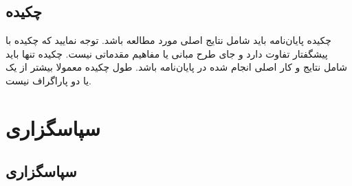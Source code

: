 \documentclass[12pt]{report}
\begin{document}
	\section*{چکیده}
	چکیده پایان‌نامه باید شامل نتایج اصلی مورد مطالعه باشد. توجه نمایید که چکیده با پیشگفتار تفاوت دارد و جای طرح مبانی یا مفاهیم مقدماتی نیست. چکیده تنها باید شامل نتایج و کار اصلی انجام شده در پایان‌نامه باشد. طول چکیده معمولا بیشتر از یک یا دو پاراگراف نیست.
	
	
	\chapter*{سپاسگزاری}
	\section*{سپاسگزاری}
	
	
\end{document}
